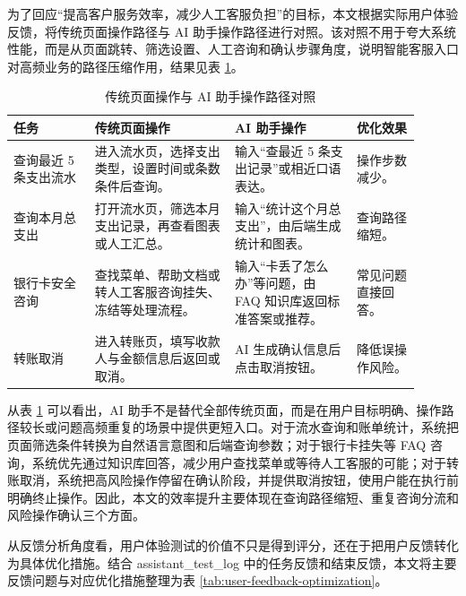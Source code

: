 \documentclass[bachelor, print]{xduthesis}
\begin{document}
为了回应“提高客户服务效率，减少人工客服负担”的目标，本文根据实际用户体验反馈，将传统页面操作路径与 AI 助手操作路径进行对照。该对照不用于夸大系统性能，而是从页面跳转、筛选设置、人工咨询和确认步骤角度，说明智能客服入口对高频业务的路径压缩作用，结果见表 \ref{tab:efficiency-path-comparison}。

\begin{table}[H]
    \centering
    \caption{传统页面操作与 AI 助手操作路径对照}
    \label{tab:efficiency-path-comparison}
    \scriptsize
    \setlength{\tabcolsep}{2pt}
    \begin{tabular}{|p{0.18\linewidth}|p{0.31\linewidth}|p{0.27\linewidth}|p{0.14\linewidth}|}
        \hline
        任务 & 传统页面操作 & AI 助手操作 & 优化效果 \\
        \hline
        查询最近 5 条支出流水 & 进入流水页，选择支出类型，设置时间或条数条件后查询。 & 输入“查最近 5 条支出记录”或相近口语表达。 & 操作步数减少。 \\
        \hline
        查询本月总支出 & 打开流水页，筛选本月支出记录，再查看图表或人工汇总。 & 输入“统计这个月总支出”，由后端生成统计和图表。 & 查询路径缩短。 \\
        \hline
        银行卡安全咨询 & 查找菜单、帮助文档或转人工客服咨询挂失、冻结等处理流程。 & 输入“卡丢了怎么办”等问题，由 FAQ 知识库返回标准答案或推荐。 & 常见问题直接回答。 \\
        \hline
        转账取消 & 进入转账页，填写收款人与金额信息后返回或取消。 & AI 生成确认信息后点击取消按钮。 & 降低误操作风险。 \\
        \hline
    \end{tabular}
\end{table}

从表 \ref{tab:efficiency-path-comparison} 可以看出，AI 助手不是替代全部传统页面，而是在用户目标明确、操作路径较长或问题高频重复的场景中提供更短入口。对于流水查询和账单统计，系统把页面筛选条件转换为自然语言意图和后端查询参数；对于银行卡挂失等 FAQ 咨询，系统优先通过知识库回答，减少用户查找菜单或等待人工客服的可能；对于转账取消，系统把高风险操作停留在确认阶段，并提供取消按钮，使用户能在执行前明确终止操作。因此，本文的效率提升主要体现在查询路径缩短、重复咨询分流和风险操作确认三个方面。

从反馈分析角度看，用户体验测试的价值不只是得到评分，还在于把用户反馈转化为具体优化措施。结合 assistant\_test\_log 中的任务反馈和结束反馈，本文将主要反馈问题与对应优化措施整理为表 \ref{tab:user-feedback-optimization}。
\end{document}
